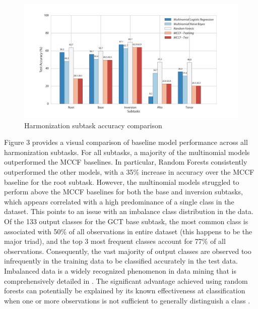 \documentclass[11pt]{article}
\begin{document}
\begin{figure}[ht]
\caption{ Harmonization subtask accuracy comparison }
\centerline{\includegraphics[scale=0.5]{subtasks}}
\end{figure}



Figure 3 provides a visual comparison of baseline model performance across all harmonization subtasks. For all subtasks, a majority of the multinomial models outperformed the MCCF baselines. In particular, Random Forests consistently outperformed the other models, with a 35\% increase in accuracy over the MCCF baseline for the root subtask. However, the multinomial models struggled to perform above the MCCF baselines  for both the base and inversion subtasks, which appears correlated with a high predominance of a single class in the dataset. This points to an issue with an imbalance class distribution in the data. Of the 133 output classes for the GCT base subtask, the most common class is associated with 50\% of all observations in entire dataset (this happens to be the major triad), and the top 3 most frequent classes account for 77\% of all observations. Consequently, the vast majority of output classes are observed too infrequently in the training data to be classified accurately in the test data. Imbalanced data is a widely recognized phenomenon in data mining that is comprehensively detailed in \citet{sun2009classification}. The significant advantage achieved using random forests can potentially be explained by its known effectiveness at classification when one or more observations is not sufficient to generally distinguish a class \citep[pg.~18]{breiman2001}.

\printbibliography
\end{document}
